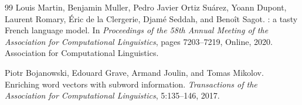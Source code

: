\documentclass[12pt,letterpaper]{article}
\begin{document}
\begin{thebibliography}{99}
Louis Martin, Benjamin Muller, Pedro Javier Ortiz Su{\'a}rez, Yoann Dupont,
  Laurent Romary, {\'E}ric de la Clergerie, Djam{\'e} Seddah, and Beno{\^i}t Sagot.
: a tasty {French} language model.
\newblock In \textit{Proceedings of the 58th Annual Meeting of the Association
  for Computational Linguistics}, pages 7203--7219, Online, 2020.
  Association for Computational Linguistics.

Piotr Bojanowski, Edouard Grave, Armand Joulin, and Tomas Mikolov.
\newblock Enriching word vectors with subword information.
\newblock \textit{Transactions of the Association for Computational Linguistics}, 5:135--146, 2017.

\end{thebibliography}
\end{document}
